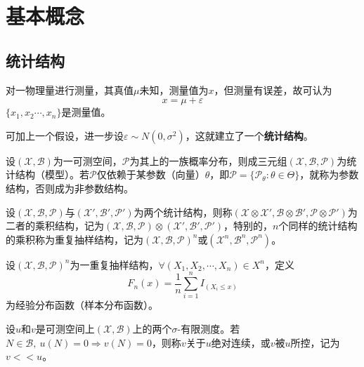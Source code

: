 \section{基本概念}
\subsection{统计结构}
\begin{example}
    对一物理量进行测量，其真值$\mu$未知，测量值为$x$，但测量有误差，故可认为
    \[
        x = \mu+\varepsilon
    \]
    $\{ x_1,x_2\cdots,x_n \}$是测量值。

    可加上一个假设，进一步设$\varepsilon\sim N(0, \sigma^2)$，这就建立了一个\textbf{\textcolor{main1}{统计结构}}。
\end{example}
\begin{definition}[统计结构]
    设$(\mathscr{X},\mathscr{B})$为一可测空间，$\mathscr{P}$为其上的一族概率分布，则成三元组$(\mathscr{X},\mathscr{B},\mathscr{P})$为统计结构（模型）。若$\mathscr{P}$仅依赖于某参数（向量）$\theta$，即$\mathscr{P} = \{ \mathscr{P}_{\theta}:\theta\in \Theta \}$，就称为参数结构，否则成为非参数结构。
\end{definition}

\begin{definition}[乘积结构与重复抽样结构]
    设$(\mathscr{X},\mathscr{B},\mathscr{P})$与$(\mathscr{X}',\mathscr{B}',\mathscr{P}')$为两个统计结构，则称$(\mathscr{X}\otimes \mathscr{X}',\mathscr{B}\otimes \mathscr{B}',\mathscr{P}\otimes \mathscr{P}')$为二者的乘积结构，记为$(\mathscr{X},\mathscr{B},\mathscr{P})\otimes (\mathscr{X}',\mathscr{B}',\mathscr{P}')$，特别的，$n$个同样的统计结构的乘积称为重复抽样结构，记为$(\mathscr{X},\mathscr{B},\mathcal{P})^{n}$或$(\mathscr{X}^{n},\mathscr{B}^{n},\mathcal{P}^{n})$。
\end{definition}

\begin{definition}[样本分布函数]
    设$ (\mathscr{X},\mathscr{B},\mathscr{P})^{n} $为一重复抽样结构，$\forall (X_1, X_2, \cdots, X_n)\in X^n$，定义
    \[
        F_n(x) = \dfrac{1}{n}\sum\limits_{i = 1}^{n}I_{(X_i\leqslant x)}
    \]
    为经验分布函数（\textcolor{thid1}{样本分布函数}）。
\end{definition}

\begin{definition}[所控]
    设$u$和$v$是可测空间上$(\mathscr{X},\mathscr{B})$上的两个\textcolor{main1}{$\sigma$-有限测度}。若$N\in \mathscr{B}, \ u(N) = 0\Rightarrow v(N)=0$，则称\textcolor{thid1}{$v$关于$u$绝对连续}，或$v$被$u$所控，记为$v<<u$。
\end{definition}

